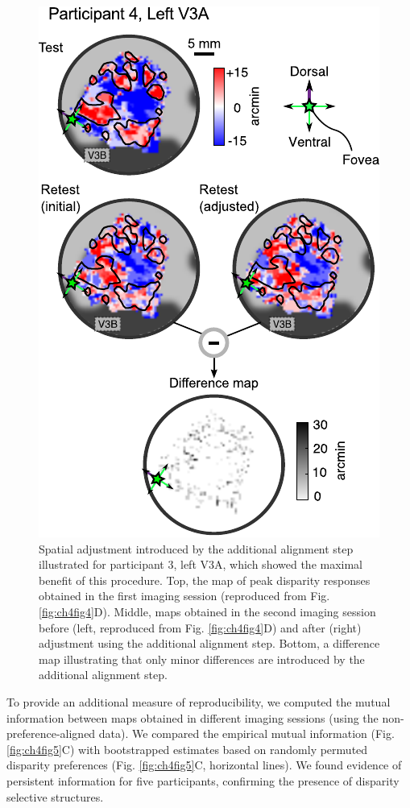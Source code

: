 \begin{figure}
  \centering
  \includegraphics{fig6}
  \caption[Spatial adjustment step.]{Spatial adjustment introduced by the additional alignment step illustrated for participant 3, left V3A, which showed the maximal benefit of this procedure. Top, the map of peak disparity responses obtained in the first imaging session (reproduced from Fig. \ref{fig:ch4fig4}D). Middle, maps obtained in the second imaging session before (left, reproduced from Fig. \ref{fig:ch4fig4}D) and after (right) adjustment using the additional alignment step. Bottom, a difference map illustrating that only minor differences are introduced by the additional alignment step.}
  \label{fig:ch4fig6}
\end{figure}


To provide an additional measure of reproducibility, we computed the mutual information \cite{Shannon1948,shannon1949} between maps obtained in different imaging sessions (using the non-preference-aligned data). We compared the empirical mutual information (Fig. \ref{fig:ch4fig5}C) with bootstrapped estimates based on randomly permuted disparity preferences (Fig. \ref{fig:ch4fig5}C, horizontal lines). We found evidence of persistent information for five participants, confirming the presence of disparity selective structures.

